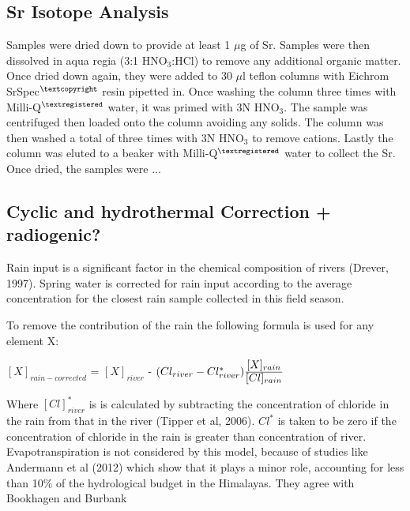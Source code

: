 
\subsection{Sr Isotope Analysis}

Samples were dried down to provide at least 1 $\mu$g of Sr. Samples were then dissolved in aqua regia (3:1 HNO$_3$:HCl) to remove any additional organic matter. Once dried down again, they were added to 30 $\mu$l teflon columns with Eichrom SrSpec$^{\textcopyright}$ resin pipetted in. Once washing the column three times with Milli-Q$^{\textregistered}$ water, it was primed with 3N HNO$_3$. The sample was centrifuged then loaded onto the column avoiding any solids. The column was then washed a total of three times with 3N HNO$_3$ to remove cations. Lastly the column was eluted to a beaker with Milli-Q$^{\textregistered}$ water to collect the Sr. Once dried, the samples were ...





\subsection{Cyclic and hydrothermal Correction + radiogenic?}

Rain input is a significant factor in the chemical composition of rivers (Drever, 1997).
Spring water is corrected for rain input according to the average concentration for the closest 
rain sample collected in this field season. %

\bsk

To remove the contribution of the rain the following formula is used for any element X:

\begin{center}
{\Large
$[X]_{rain-corrected}$  = $[X]_{river}$ - $(Cl_{river} - Cl^*_{river})\ddfrac{[X]_{rain}}{[Cl]_{rain}}$}

\end{center}

Where $[Cl]^*_{river}$ is is calculated by subtracting the concentration of chloride in the rain from that in the river (Tipper et al, 2006).
$Cl^{*}$ is taken to be zero if the concentration of chloride in the rain is greater than concentration of river. Evapotranspiration is not considered by this model, because of
studies like Andermann et al (2012) which show that it plays a minor role, accounting for less than 10\% of the hydrological budget in the Himalayas.
They agree with Bookhagen and Burbank


